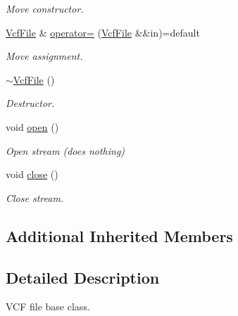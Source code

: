 \begin{DoxyCompactItemize}
\begin{DoxyCompactList}\small\item\em Move constructor. \end{DoxyCompactList}\item 
\mbox{\label{classsamp_files_1_1_vcf_file_a93bf6aed7d47dd5e4db584fa7bef37b2}} 
\hyperlink{classsamp_files_1_1_vcf_file}{Vcf\+File} \& \hyperlink{classsamp_files_1_1_vcf_file_a93bf6aed7d47dd5e4db584fa7bef37b2}{operator=} (\hyperlink{classsamp_files_1_1_vcf_file}{Vcf\+File} \&\&in)=default
\begin{DoxyCompactList}\small\item\em Move assignment. \end{DoxyCompactList}\item 
\mbox{\label{classsamp_files_1_1_vcf_file_ab8c67de2414a1f86b858754cd1eb6193}} 
\hyperlink{classsamp_files_1_1_vcf_file_ab8c67de2414a1f86b858754cd1eb6193}{$\sim$\+Vcf\+File} ()
\begin{DoxyCompactList}\small\item\em Destructor. \end{DoxyCompactList}\item 
\mbox{\label{classsamp_files_1_1_vcf_file_a9054a1e2ac97c24df85876cfc89fdb98}} 
void \hyperlink{classsamp_files_1_1_vcf_file_a9054a1e2ac97c24df85876cfc89fdb98}{open} ()
\begin{DoxyCompactList}\small\item\em Open stream (does nothing) \end{DoxyCompactList}\item 
\mbox{\label{classsamp_files_1_1_vcf_file_a42acb5069085bdab92e26257b7cd7e47}} 
void \hyperlink{classsamp_files_1_1_vcf_file_a42acb5069085bdab92e26257b7cd7e47}{close} ()
\begin{DoxyCompactList}\small\item\em Close stream. \end{DoxyCompactList}\end{DoxyCompactItemize}
\subsection*{Additional Inherited Members}


\subsection{Detailed Description}
V\+CF file base class. 

